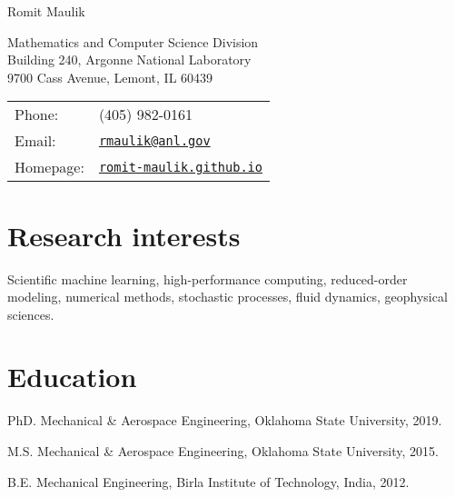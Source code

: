 \documentclass[letterpaper]{article}
\def\name{Romit Maulik}
\renewenvironment{itemize}{
  \begin{list}{}{
    \setlength{\leftmargin}{1.5em}
  }
}{
  \end{list}
}
\begin{document}
{\huge \name}


\vspace{0.25in}

\begin{minipage}{0.45\linewidth}
  Mathematics and Computer Science Division \\
  Building 240, Argonne National Laboratory \\
  9700 Cass Avenue, Lemont, IL 60439
\end{minipage}
\begin{minipage}{0.45\linewidth}
  \begin{tabular}{ll}
    Phone: & (405) 982-0161 \\
    Email: & \href{mailto:rmaulik@anl.gov}{\tt rmaulik@anl.gov} \\
    Homepage: & \href{https://romit-maulik.github.io/}{\tt romit-maulik.github.io} \\
  \end{tabular}
\end{minipage}

\section*{Research interests}

Scientific machine learning, high-performance computing, reduced-order modeling, numerical methods, stochastic processes, fluid dynamics, geophysical sciences.

\section*{Education}

\begin{itemize}
  \item PhD. Mechanical \& Aerospace Engineering, Oklahoma State University, 2019.
  \item M.S. Mechanical \& Aerospace Engineering, Oklahoma State University, 2015.
  \item B.E. Mechanical Engineering, Birla Institute of Technology, India, 2012. 
\end{itemize}
\end{document}
